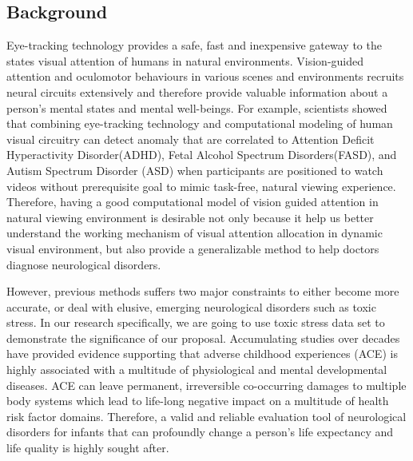 \documentclass[a4paper, times, 12pt, ,onecolumn,oneside,top=1.0cm,bottom=1.0cm,left=1.0 cm,right=1cm]{article}
\begin{document}
\subsection{Background}
Eye-tracking technology provides a safe, fast and inexpensive gateway to the states visual attention of humans in natural environments. Vision-guided attention and oculomotor behaviours in various scenes and environments recruits neural circuits extensively and therefore provide valuable information about a person's mental states and mental well-beings. For example, scientists showed that combining eye-tracking technology and computational modeling of human visual circuitry can detect anomaly that are correlated to Attention Deficit Hyperactivity Disorder(ADHD)\cite{pmid22926163}, Fetal Alcohol Spectrum Disorders(FASD)\cite{fneur.2019.00080}, and Autism Spectrum Disorder (ASD)\cite{pmid26593094} when participants are positioned to watch videos without prerequisite goal to mimic task-free, natural viewing experience. Therefore, having a good computational model of vision guided attention in natural viewing environment is desirable not only because it help us better understand the working mechanism of visual attention allocation in dynamic visual environment, but also provide a generalizable method to help doctors diagnose neurological disorders.

However, previous methods suffers two major constraints to either become more accurate, or deal with elusive, emerging neurological disorders such as toxic stress. In our research specifically, we are going to use toxic stress data set to demonstrate the significance of our proposal. Accumulating studies over decades have provided evidence supporting that adverse childhood experiences (ACE) is highly associated with a multitude of physiological and mental developmental diseases. ACE can leave permanent, irreversible co-occurring damages to multiple body systems which lead to life-long negative impact on a multitude of health risk factor domains.\cite{ACE}\cite{ACE1}\cite{ACE2} Therefore, a valid and reliable evaluation tool of neurological disorders for infants that can profoundly change a person's life expectancy and life quality is highly sought after.
\end{document}
